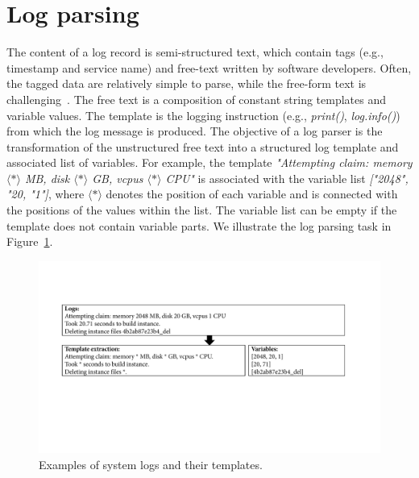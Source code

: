 \section{Log parsing}\label{ch:logs:logparsing}
The content of a log record is semi-structured text, which contain tags (e.g., timestamp and service name) and free-text written by software developers. Often, the tagged data are relatively simple to parse, while the free-form text is challenging~\cite{he2017drain,zhu2019tools}. The free text is a composition of constant string templates and variable values. The template is the logging instruction (e.g., \textit{print()}, \textit{log.info()}) from which the log message is produced. The objective of a log parser is the transformation of the unstructured free text into a structured log template and associated list of variables. For example, the template \textit{"Attempting claim: memory $\langle * \rangle$ MB, disk $\langle * \rangle$ GB, vcpus $\langle * \rangle$ CPU"} is associated with the variable list \textit{["2048", "20, "1"]}, where $\langle * \rangle$ denotes the position of each variable and is connected with the positions of the values within the list. The variable list can be empty if the template does not contain variable parts. We illustrate the log parsing task in Figure~\ref{fig:log_parsing_task}.

\begin{figure}[htbp]
\centerline{\includegraphics[width=1.0\textwidth]{gfx/chap5/log_parsing_task.pdf}}
\caption{Examples of system logs and their templates.}
\label{fig:log_parsing_task}
\end{figure}

